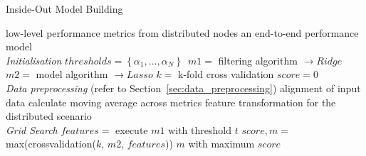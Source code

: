  \begin{algorithm}
 \caption{Inside-Out Model Building}
 \begin{algorithmic}[1]
 \renewcommand{\algorithmicrequire}{\textbf{Input:}}
 \renewcommand{\algorithmicensure}{\textbf{Output:}}
 \REQUIRE low-level performance metrics from distributed nodes
 \ENSURE  an end-to-end performance model
 \\ \textit{Initialisation}
  \STATE $thresholds = \left \{ \alpha_{1}, ... , \alpha_{N} \right \} $\
  \STATE $m1 =$ filtering algorithm $\rightarrow Ridge$
  \STATE $m2 =$ model algorithm $\rightarrow Lasso$
  \STATE $k =$ k-fold cross validation
  \STATE $score = 0$
 \\ \textit{Data preprocessing} (refer to Section~\ref{sec:data_preprocessing})
  \STATE alignment of input data
  \STATE calculate moving average across metrics
  \STATE feature transformation for the distributed scenario
 \\ \textit{Grid Search}
  \STATE $features =$ execute $m1$ with threshold $t$
  \STATE $score, m = $max(crossvalidation($k$, $m2$, $features$))
  \ENDFOR
 \RETURN $m$ with maximum $score$
 \end{algorithmic} 
 \end{algorithm}